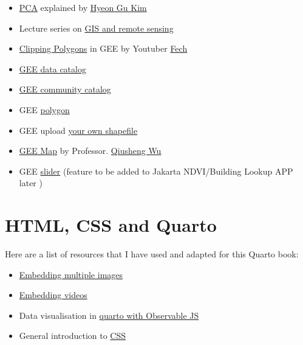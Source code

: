 \documentclass[
  letterpaper,
  DIV=11,
  numbers=noendperiod]{scrreprt}
\begin{document}

\begin{itemize}
\item
  \href{https://grantkim94.medium.com/cracking-principal-components-analysis-pca-part-1-1372736ebac7}{PCA}
  explained by \href{https://grantkim94.medium.com/}{Hyeon Gu Kim}
\item
  Lecture series on
  \href{https://youtu.be/VfDAd-MO94o?si=GsM4nYqmlHjU8WO1}{GIS and remote
  sensing}
\end{itemize}

\begin{itemize}
\item
  \href{https://www.youtube.com/watch?v=E2MyYxkV7oY}{Clipping Polygons}
  in GEE by Youtuber \href{https://www.youtube.com/@fech1285}{Fech}
\item
  \href{https://developers.google.com/earth-engine/datasets}{GEE data
  catalog}
\item
  \href{https://gee-community-catalog.org/}{GEE community catalog}
\item
  GEE
  \href{https://developers.google.com/earth-engine/apidocs/ee-geometry-polygon}{polygon}
\item
  GEE upload
  \href{https://stackoverflow.com/questions/68663744/how-do-you-use-a-shapefile-asset-as-your-aoi-in-gee}{your
  own shapefile}
\item
  \href{https://book.geemap.org/}{GEE Map} by Professor.
  \href{https://dot.cards/giswqs}{Qiusheng Wu}
\item
  GEE
  \href{https://developers.google.com/earth-engine/apidocs/ui-slider}{slider}
  (feature to be added to Jakarta NDVI/Building Lookup APP later )
\end{itemize}

\hypertarget{html-css-and-quarto}{%
\section*{HTML, CSS and Quarto}\label{html-css-and-quarto}}


Here are a list of resources that I have used and adapted for this
Quarto book:

\begin{itemize}
\item
  \href{https://www.shecodes.io/athena/1837-how-to-put-2-images-on-one-line-with-css}{Embedding
  multiple images}
\item
  \href{https://quarto.org/docs/authoring/videos.html}{Embedding videos}
\item
  Data visualisation in
  \href{https://quarto.org/docs/interactive/ojs/}{quarto with Observable
  JS}
\item
  General introduction to
  \href{https://www.w3schools.com/css/default.asp}{CSS}
\end{itemize}
\end{document}
